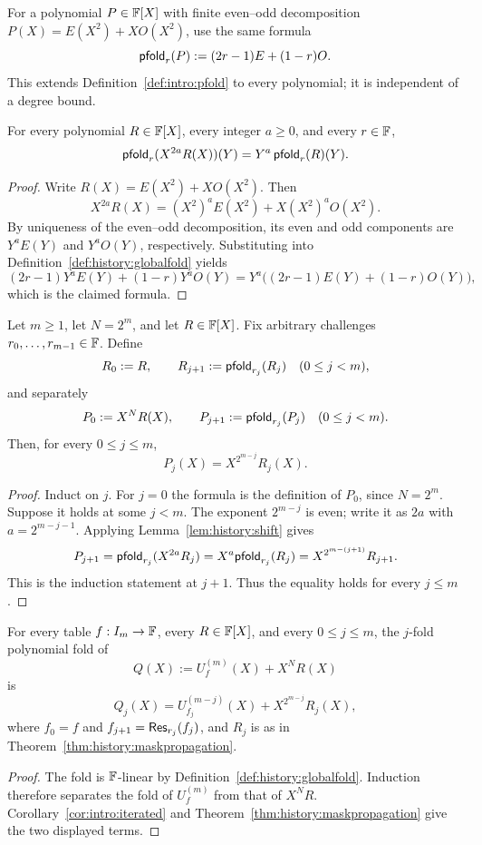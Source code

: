 \begin{definition}\label{def:history:globalfold}
For a polynomial $P\in\mathbb{F}[X]$ with finite even--odd decomposition $P(X)=E(X^2)+XO(X^2)$, use the same formula
\[
 \mathsf{pfold}_r(P):=(2r-1)E+(1-r)O.
\]
This extends Definition~\ref{def:intro:pfold} to every polynomial; it is independent of a degree bound.
\end{definition}

\begin{lemma}\label{lem:history:shift}
For every polynomial $R\in\mathbb{F}[X]$, every integer $a\geq0$, and every $r\in\mathbb{F}$,
\[
 \mathsf{pfold}_r(X^{2a}R(X))(Y)=Y^a\,\mathsf{pfold}_r(R)(Y).
\]
\end{lemma}
\begin{proof}
Write $R(X)=E(X^2)+XO(X^2)$. Then
\[
 X^{2a}R(X)
 =(X^2)^aE(X^2)+X(X^2)^aO(X^2).
\]
By uniqueness of the even--odd decomposition, its even and odd components are $Y^aE(Y)$ and $Y^aO(Y)$, respectively. Substituting into Definition~\ref{def:history:globalfold} yields
\[
 (2r-1)Y^aE(Y)+(1-r)Y^aO(Y)
 =Y^a\bigl((2r-1)E(Y)+(1-r)O(Y)\bigr),
\]
which is the claimed formula.
\end{proof}

\begin{theorem}\label{thm:history:maskpropagation}
Let $m\geq1$, let $N=2^m$, and let $R\in\mathbb{F}[X]$. Fix arbitrary challenges $r_0,\ldots,r_{m-1}\in\mathbb{F}$. Define
\[
 R_0:=R,\qquad R_{j+1}:=\mathsf{pfold}_{r_j}(R_j)\quad(0\leq j<m),
\]
and separately
\[
 P_0:=X^N R(X),\qquad P_{j+1}:=\mathsf{pfold}_{r_j}(P_j)\quad(0\leq j<m).
\]
Then, for every $0\leq j\leq m$,
\[
 \boxed{P_j(X)=X^{2^{m-j}}R_j(X).}
\]
\end{theorem}
\begin{proof}
Induct on $j$. For $j=0$ the formula is the definition of $P_0$, since $N=2^m$. Suppose it holds at some $j<m$. The exponent $2^{m-j}$ is even; write it as $2a$ with $a=2^{m-j-1}$. Applying Lemma~\ref{lem:history:shift} gives
\[
 P_{j+1}=\mathsf{pfold}_{r_j}(X^{2a}R_j)
 =X^a\mathsf{pfold}_{r_j}(R_j)
 =X^{2^{m-(j+1)}}R_{j+1}.
\]
This is the induction statement at $j+1$. Thus the equality holds for every $j\leq m$.
\end{proof}

\begin{corollary}\label{cor:history:masked-kbfold}
For every table $f:I_m\to\mathbb{F}$, every $R\in\mathbb{F}[X]$, and every $0\leq j\leq m$, the $j$-fold polynomial fold of
\[
 Q(X):=U_f^{(m)}(X)+X^N R(X)
\]
is
\[
 Q_j(X)
 =U_{f_j}^{(m-j)}(X)+X^{2^{m-j}}R_j(X),
\]
where $f_0=f$ and $f_{j+1}=\mathsf{Res}_{r_j}(f_j)$, and $R_j$ is as in Theorem~\ref{thm:history:maskpropagation}.
\end{corollary}
\begin{proof}
The fold is $\mathbb{F}$-linear by Definition~\ref{def:history:globalfold}. Induction therefore separates the fold of $U_f^{(m)}$ from that of $X^N R$. Corollary~\ref{cor:intro:iterated} and Theorem~\ref{thm:history:maskpropagation} give the two displayed terms.
\end{proof}

